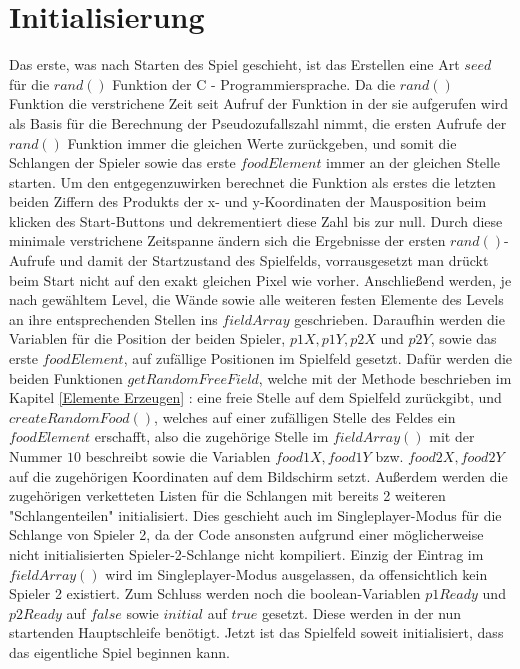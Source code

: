\section{Initialisierung}
\label{Initialisierung}
%
Das erste, was nach Starten des Spiel geschieht, ist das Erstellen eine Art $seed$ f{\"u}r die $rand()$ Funktion der C - Programmiersprache. Da die $rand()$ Funktion die verstrichene Zeit seit Aufruf der Funktion in der sie aufgerufen wird als Basis f{\"u}r die Berechnung der Pseudozufallszahl nimmt, die ersten Aufrufe der $rand()$ Funktion immer die gleichen Werte zur{\"u}ckgeben, und somit die Schlangen der Spieler sowie das erste $foodElement$ immer an der gleichen Stelle starten. Um den entgegenzuwirken berechnet die Funktion als erstes die letzten beiden Ziffern des Produkts der x- und y-Koordinaten der Mausposition beim klicken des Start-Buttons und dekrementiert diese Zahl bis zur null. Durch diese minimale verstrichene Zeitspanne {\"a}ndern sich die Ergebnisse der ersten $rand()$-Aufrufe und damit der Startzustand des Spielfelds, vorrausgesetzt man dr{\"u}ckt beim Start nicht auf den exakt gleichen Pixel wie vorher.
Anschlie{\ss}end werden, je nach gew{\"a}hltem Level, die W{\"a}nde sowie alle weiteren festen Elemente des Levels an ihre entsprechenden Stellen ins $fieldArray$ geschrieben.
Daraufhin werden die Variablen f{\"u}r die Position der beiden Spieler, $p1X, p1Y, p2X$ und $p2Y$, sowie das erste $foodElement$, auf zuf{\"a}llige Positionen im Spielfeld gesetzt. Dafür werden die beiden Funktionen $getRandomFreeField$, welche mit der Methode beschrieben im Kapitel \ref{Elemente Erzeugen}  :  eine freie Stelle auf dem Spielfeld zurückgibt, und $createRandomFood()$, welches auf einer zufälligen Stelle des Feldes ein $foodElement$ erschafft, also die zugehörige Stelle im $fieldArray()$ mit der Nummer $10$ beschreibt sowie die Variablen $food1X, food1Y$ bzw. $food2X, food2Y$ auf die zugehörigen Koordinaten auf dem Bildschirm setzt. Außerdem werden die zugeh{\"o}rigen verketteten Listen f{\"u}r die Schlangen mit bereits 2 weiteren "Schlangenteilen" initialisiert. Dies geschieht auch im Singleplayer-Modus f{\"u}r die Schlange von Spieler 2, da der Code ansonsten aufgrund einer m{\"o}glicherweise nicht initialisierten Spieler-2-Schlange nicht kompiliert. Einzig der Eintrag im $fieldArray()$  wird im Singleplayer-Modus ausgelassen, da offensichtlich kein Spieler 2 existiert.
Zum Schluss werden noch die boolean-Variablen $p1Ready$ und $p2Ready$ auf $false$ sowie $initial$ auf $true$ gesetzt. Diese werden in der nun startenden Hauptschleife benötigt.
Jetzt ist das Spielfeld soweit initialisiert, dass das eigentliche Spiel beginnen kann.
%


